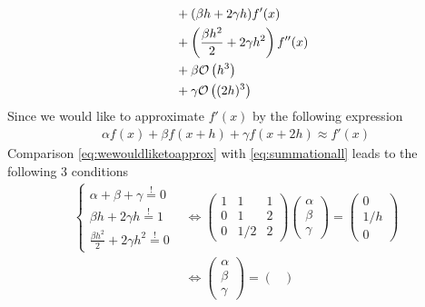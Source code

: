 \documentclass[12pt]{article}
\begin{document}
\begin{enumerate}
\begin{align}
		       & \quad + (\beta h + 2 \gamma h)f'(x) \notag                            \\
		       & \quad + \left( \frac{\beta h^2}{2} + 2\gamma h^2 \right)f''(x) \notag \\
		       & \quad + \beta \mathcal{O}\left( h^3 \right)                    \notag \\
		       & \quad + \gamma \mathcal{O}\left( (2h)^3 \right)
	      \end{align}
	      Since we would like to approximate $f'(x)$ by the following expression
	      \begin{align}
		      \label{eq:wewouldliketoapprox}
		      \alpha f(x) + \beta f(x+h) + \gamma f(x+2h) \approx f'(x)
	      \end{align}
	      Comparison \eqref{eq:wewouldliketoapprox} with \eqref{eq:summationall} leads to the following 3 conditions
	      \begin{align}
		      \label{eq:alphabetagamma}
		      \begin{cases}
			      \alpha + \beta + \gamma \stackrel{!}{=} 0 \\
			      \beta h + 2 \gamma h \stackrel{!}{=}  1   \\
			      \displaystyle \frac{\beta h^2}{2} + 2\gamma h^2 \stackrel{!}{=} 0
		      \end{cases}
		       & \Leftrightarrow
		      \begin{pmatrix}
			      1 & 1   & 1 \\
			      0 & 1   & 2 \\
			      0 & 1/2 & 2
		      \end{pmatrix}
		      \begin{pmatrix}
			      \alpha \\ \beta \\ \gamma
		      \end{pmatrix}
		      =
		      \begin{pmatrix}
			      0 \\ 1/h \\ 0
		      \end{pmatrix} \\
		       & \Leftrightarrow
		      \begin{pmatrix}
			      \alpha \\ \beta \\ \gamma
		      \end{pmatrix}
		      =
		      \begin{pmatrix}

\end{pmatrix}
\end{align}
\end{enumerate}
\end{document}
